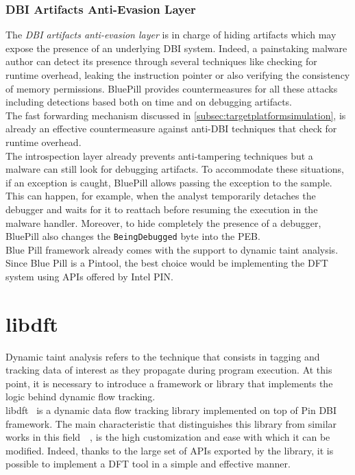 \documentclass[LaM,binding=0.6cm]{sapthesis}
\begin{document}
\subsubsection{DBI Artifacts Anti-Evasion Layer}
The \textit{DBI artifacts anti-evasion layer} is in charge of hiding artifacts which may expose the presence of an underlying DBI system. Indeed, a painstaking malware author can detect its presence through several techniques like checking for runtime overhead, leaking the instruction pointer or also verifying the consistency of memory permissions. BluePill provides countermeasures for all these attacks including detections based both on time and on debugging artifacts.\\
The fast forwarding mechanism discussed in \autoref{subsec:targetplatformsimulation}, is already an effective countermeasure against anti-DBI techniques that check for runtime overhead.\\
The introspection layer already prevents anti-tampering techniques but a malware can still look for debugging artifacts. To accommodate these situations, if an exception is caught, BluePill allows passing the exception to the sample. This can happen, for example, when the analyst temporarily detaches the debugger and waits for it to reattach before resuming the execution in the malware handler. Moreover, to hide completely the presence of a debugger, BluePill also changes the \texttt{BeingDebugged} byte into the PEB.\\

Blue Pill framework already comes with the support to dynamic taint analysis. Since Blue Pill is a Pintool, the best choice would be implementing the DFT system using APIs offered by Intel PIN.

\section{libdft}
Dynamic taint analysis refers to the technique that consists in tagging and tracking data of interest as they propagate during program execution. At this point, it is necessary to introduce a framework or library that implements the logic behind dynamic flow tracking.\\
libdft~\cite{kemerlis2012libdft} is a dynamic data flow tracking library implemented on top of Pin DBI framework. The main characteristic that distinguishes this library from similar works in this field~\cite{bosman2011minemu}~\cite{qin2006lift}, is the high customization and ease with which it can be modified. Indeed, thanks to the large set of APIs exported by the library, it is possible to implement a DFT tool in a simple and effective manner.
\end{document}
